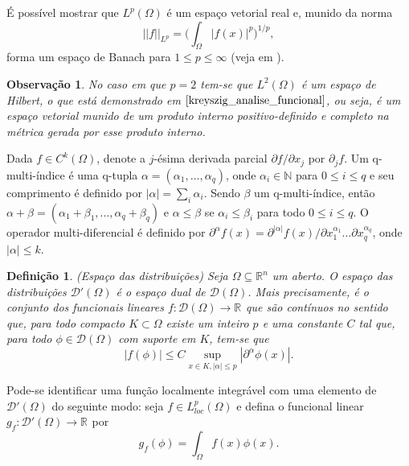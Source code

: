 \documentclass[12pt]{book}
\newtheorem{definicao}[teorema]{Definição}
\newtheorem{observacao}[teorema]{Observação}
\newcommand{\derivadaparcialabrev}[1]{\partial_{#1}}
\newcommand{\distribuicoes}{\distribuicoesgeral{\Omega}}
\newcommand{\distribuicoesgeral}[1]{\mathcal{D'}(#1)}
\newcommand{\espacoLdois}[1]{L^{2}(#1)}
\newcommand{\espacoLpcomp}[1]{L^{p}_{loc}(#1)}
\newcommand{\espacoLpGeral}[2]{L^{#1}(#2)}
\newcommand{\funcoesdiferenciaveis}[2]{C^{#1}(#2)}
\newcommand{\funcoesteste}{\funcoestestegeral{\Omega}}
\newcommand{\funcoestestegeral}[1]{\mathcal{D}(#1)}
\newcommand{\normaLp}[1]{||#1||_{L^{p}}}
\newcommand{\normaLpdefinicao}[2]{ \Big(\int_{#2}#1^{p}\Big)^{1/p}}
\newcommand{\real}[1]{\mathbb{R}^{#1}}
\newcommand{\reta}{\real{}}
\begin{document}
	
	É possível mostrar que $\espacoLpGeral{p}{\Omega}$ é um espaço vetorial real e, munido da norma
	$$
	\normaLp{f}=\normaLpdefinicao{|f(x)|}{\Omega},
	$$
	forma um espaço de Banach para $1\leq p\leq \infty$ (veja em \cite{breazis_sobolev_spaces}). 
	
	\begin{observacao}
		No caso em que $p=2$ tem-se que $\espacoLdois{\Omega}$ é um espaço de Hilbert, o que está demonstrado em $\cite{kreyszig_analise_funcional}$, ou seja, é um espaço vetorial munido de um produto interno positivo-definido e completo na métrica gerada por esse produto interno.
	\end{observacao}
	
	Dada $f \in \funcoesdiferenciaveis{k}{\Omega}$, denote a $j$-ésima derivada parcial $\partial f/\partial x_{j}$ por $\derivadaparcialabrev{j}f $. Um q-multi-índice é uma q-tupla $\alpha = (\alpha_{1}, \dots, \alpha_{q})$, onde $\alpha_{i} \in \mathbb{N}$ para $0\leq i \leq q$ e seu comprimento é definido por $|\alpha| = \sum_{i}\alpha_{i}$. Sendo $\beta$ um q-multi-índice, então $\alpha+\beta=(\alpha_{1}+\beta_{1}, \dots, \alpha_{q}+\beta_{q})$ e $\alpha\leq \beta$ se $\alpha_{i}\leq\beta_{i}$ para todo $0\leq i \leq q$. O operador multi-diferencial é definido por $\partial^{\alpha} f(x) = \partial^{|\alpha|}f(x)/\partial{x^{\alpha_{1}}_{1}} \dots \partial{x^{\alpha_{q}}_{q}}$, onde $|\alpha|\leq k$.
	
	\begin{definicao}
		(Espaço das distribuições) Seja $\Omega \subseteq \real{n}$ um aberto. O espaço das distribuições $\distribuicoesgeral{\Omega}$ é o espaço dual de $\funcoesteste$. Mais precisamente, é o conjunto dos funcionais lineares $f:\funcoesteste \to \reta$ que são contínuos no sentido que, 	para todo compacto $K\subset \Omega$ existe um inteiro $p$ e uma constante $C$ tal que, para todo $\phi\in \funcoesteste$ com suporte em $K$, tem-se que
		$$
		|f(\phi)| \leq C \sup\limits_{x\in K, |\alpha|\leq p}|\partial^{\alpha}\phi(x)|.
		$$
	\end{definicao}
	
	Pode-se identificar uma função localmente integrável com uma elemento de $\distribuicoes$ do seguinte modo: seja $f \in \espacoLpcomp{\Omega}$ e defina o funcional linear $g_{f}:\distribuicoes \to \reta$ por 
	$$
	g_{f}(\phi)=\int_{\Omega}f(x)\phi(x).
	$$
	
\end{document}
